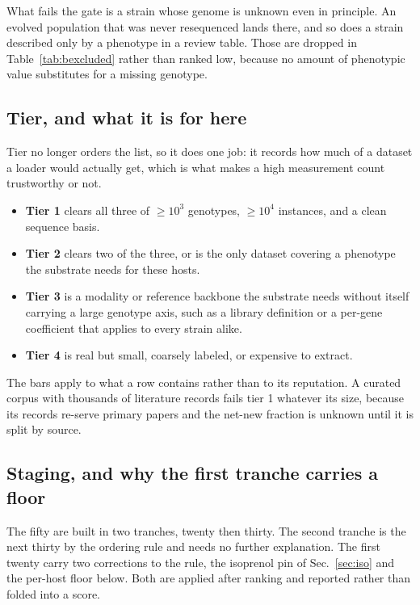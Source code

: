 What fails the gate is a strain whose genome is unknown even in principle. An evolved
population that was never resequenced lands there, and so does a strain described only by
a phenotype in a review table. Those are dropped in Table~\ref{tab:bexcluded} rather than
ranked low, because no amount of phenotypic value substitutes for a missing genotype.

\subsection{Tier, and what it is for here}

Tier no longer orders the list, so it does one job: it records how much of a dataset a
loader would actually get, which is what makes a high measurement count trustworthy or
not.

\begin{itemize}[leftmargin=1.2em,itemsep=1pt,topsep=2pt]
  \item \textbf{Tier 1} clears all three of $\geq$$10^3$ genotypes, $\geq$$10^4$
    instances, and a clean sequence basis.
  \item \textbf{Tier 2} clears two of the three, or is the only dataset covering a
    phenotype the substrate needs for these hosts.
  \item \textbf{Tier 3} is a modality or reference backbone the substrate needs without
    itself carrying a large genotype axis, such as a library definition or a per-gene
    coefficient that applies to every strain alike.
  \item \textbf{Tier 4} is real but small, coarsely labeled, or expensive to extract.
\end{itemize}

The bars apply to what a row contains rather than to its reputation. A curated corpus
with thousands of literature records fails tier 1 whatever its size, because its records
re-serve primary papers and the net-new fraction is unknown until it is split by source.

\subsection{Staging, and why the first tranche carries a floor}\label{sec:stage}

The fifty are built in two tranches, twenty then thirty. The second tranche is the next
thirty by the ordering rule and needs no further explanation. The first twenty carry two
corrections to the rule, the isoprenol pin of Sec.~\ref{sec:iso} and the per-host floor
below. Both are applied after ranking and reported rather than folded into a score.

